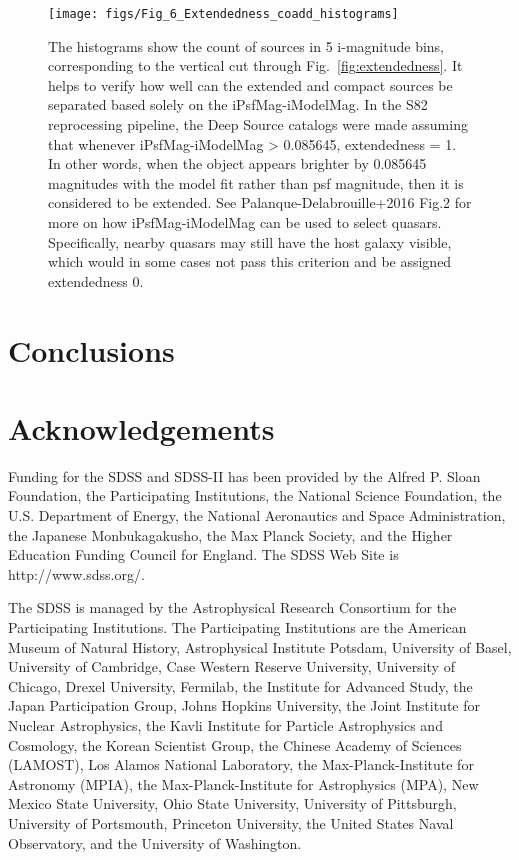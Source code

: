 \documentclass[fleqn,usenatbib]{mnras}  %
\begin{document}
\begin{figure*}

 \texttt{[image: figs/Fig\_6\_Extendedness\_coadd\_histograms]}
 \caption{The histograms show the count of sources in 5 i-magnitude bins, corresponding to the vertical cut through Fig.~\ref{fig:extendedness}. It helps to verify how well can the extended and compact sources be separated based solely on the iPsfMag-iModelMag.  In the S82 reprocessing pipeline, the Deep Source catalogs were made assuming that whenever iPsfMag-iModelMag > 0.085645,  extendedness = 1. In other words, when the object appears brighter by 0.085645 magnitudes with the model fit rather than psf magnitude, then it is considered to be extended. See Palanque-Delabrouille+2016 Fig.2 for more on how iPsfMag-iModelMag can be used to select quasars. Specifically, nearby quasars may still have the host galaxy visible, which would in some cases not pass this criterion and be assigned extendedness 0.}
 \label{fig:coadds_ext_hist}
\end{figure*}






\section{Conclusions}
\label{sec:conclusions}



\section*{Acknowledgements}

Funding for the SDSS and SDSS-II has been provided by the Alfred P. Sloan Foundation, the Participating Institutions, the National Science Foundation, the U.S. Department of Energy, the National Aeronautics and Space Administration, the Japanese Monbukagakusho, the Max Planck Society, and the Higher Education Funding Council for England. The SDSS Web Site is http://www.sdss.org/.

The SDSS is managed by the Astrophysical Research Consortium for the Participating Institutions. The Participating Institutions are the American Museum of Natural History, Astrophysical Institute Potsdam, University of Basel, University of Cambridge, Case Western Reserve University, University of Chicago, Drexel University, Fermilab, the Institute for Advanced Study, the Japan Participation Group, Johns Hopkins University, the Joint Institute for Nuclear Astrophysics, the Kavli Institute for Particle Astrophysics and Cosmology, the Korean Scientist Group, the Chinese Academy of Sciences (LAMOST), Los Alamos National Laboratory, the Max-Planck-Institute for Astronomy (MPIA), the Max-Planck-Institute for Astrophysics (MPA), New Mexico State University, Ohio State University, University of Pittsburgh, University of Portsmouth, Princeton University, the United States Naval Observatory, and the University of Washington. 
\end{document}

